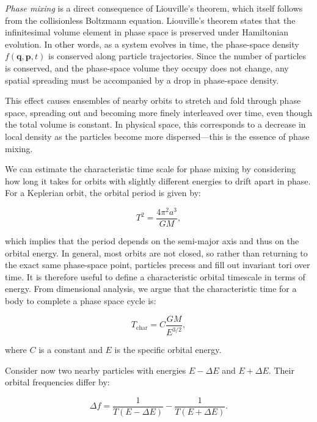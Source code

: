         
        \textit{Phase mixing} is a direct consequence of Liouville's theorem, which itself follows from the collisionless Boltzmann equation. Liouville's theorem states that the infinitesimal volume element in phase space is preserved under Hamiltonian evolution. In other words, as a system evolves in time, the phase-space density \( f(\mathbf{q}, \mathbf{p}, t) \) is conserved along particle trajectories. Since the number of particles is conserved, and the phase-space volume they occupy does not change, any spatial spreading must be accompanied by a drop in phase-space density.

        This effect causes ensembles of nearby orbits to stretch and fold through phase space, spreading out and becoming more finely interleaved over time, even though the total volume is constant. In physical space, this corresponds to a decrease in local density as the particles become more dispersed—this is the essence of phase mixing.

        We can estimate the characteristic time scale for phase mixing by considering how long it takes for orbits with slightly different energies to drift apart in phase. For a Keplerian orbit, the orbital period is given by:

        \begin{equation}
        T^2 = \frac{4\pi^2 a^3}{GM},
        \end{equation}

        which implies that the period depends on the semi-major axis and thus on the orbital energy. In general, most orbits are not closed, so rather than returning to the exact same phase-space point, particles precess and fill out invariant tori over time. It is therefore useful to define a characteristic orbital timescale in terms of energy. From dimensional analysis, we argue that the characteristic time for a body to complete a phase space cycle is:

        \begin{equation}
        T_\mathrm{char} = C \frac{GM}{E^{3/2}},
        \end{equation}

        where $ C$ is a constant and $E$ is the specific orbital energy.

        Consider now two nearby particles with energies $E - \Delta E$ and $ E + \Delta E $. Their orbital frequencies differ by:

        \begin{equation}
        \Delta f = \frac{1}{T( E - \Delta E)} - \frac{1}{T(E + \Delta E)}.
        \end{equation}

